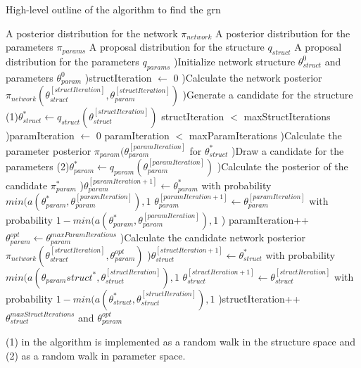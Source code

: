 \begin{algorithm}
\label{alg:find_grn}
\caption{High-level outline of the algorithm to find the grn}
\begin{algorithmic}
  \Require A posterior distribution for the network $\pi_{network}$
  \Require A posterior distribution for the parameters $\pi_{params}$
  \Require A proposal distribution for the structure $q_{struct}$
  \Require A proposal distribution for the parameters $q_{params}$
  )Initialize network structure $\theta_{struct}^0$ and parameters $\theta_{param}^0$
  )structIteration $\leftarrow$ 0
  )Calculate the network posterior $\pi_{network}(\theta_{struct}^{[structIteration]}, \theta_{param}^{[structIteration]})$ 
  )Generate a candidate for the structure (1)$\theta_{struct}^{*} \leftarrow q_{struct}(\theta_{struct}^{[structIteration]})$
  \While structIteration $<$ maxStructIterations
  )paramIteration $\leftarrow$ 0
  \While paramIteration $<$ maxParamIterations
  )Calculate the parameter posterior $\pi_{param}(\theta_{param}^{[paramIteration]}$ for $\theta_{struct}^{*}$
  )Draw a candidate for the parameters 
  \State (2)$\theta_{param}^{*} \leftarrow q_{param}(\theta_{param}^{[paramIteration]})$
  )Calculate the posterior of the candidate $\pi_{param}^{*}$
  )$\theta_{param}^{[paramIteration+1]} \leftarrow \theta_{param}^{*} $ 
\State with probability $min({a(\theta_{param}^{*}, \theta_{param}^{[paramIteration]}), 1}$ 
\State   $\theta_{param}^{[paramIteration+1]} \leftarrow \theta_{param}^{[paramIteration]} $ 
\State  with probability $ 1 - min({a(\theta_{param}^{*}, \theta_{param}^{[paramIteration]}), 1}$ 
  ) paramIteration++
  \EndWhile \\
  \State $\theta_{param}^{opt} \leftarrow \theta_{param}^{maxParamIterations}$
  )Calculate the candidate network posterior 
\State $\pi_{network}(\theta_{struct}^{[structIteration]}, \theta_{param}^{opt})$ 
  )$\theta_{struct}^{[structIteration+1]} \leftarrow \theta_{struct}^{*} $ 
\State with probability $min({a(\theta_{param}struct^{*}, \theta_{struct}^{[structIteration]}), 1}$ 
\State  $\theta_{struct}^{[structIteration+1]} \leftarrow \theta_{struct}^{[structIteration]} $ 
\State with probability $ 1 - min({a(\theta_{struct}^{*}, \theta_{struct}^{[structIteration]}), 1}$
  )structIteration++
  \EndWhile \\
  \Return $\theta_{struct}^{maxStructIterations}$ and $\theta_{param}^{opt}$
  \EndFunction
\end{algorithmic}
\end{algorithm}
(1) in the algorithm is implemented as a random walk in the structure space and (2) as a random walk in parameter space.
